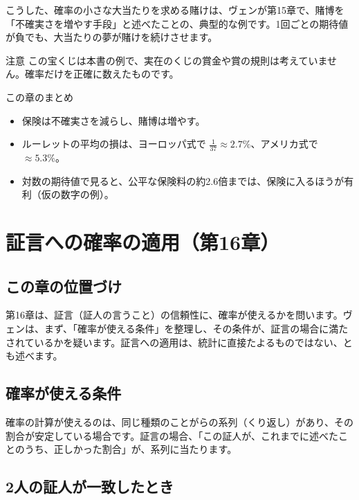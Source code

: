 \documentclass[a4paper,11pt,openany]{ltjsbook}
\begin{document}
こうした、確率の小さな大当たりを求める賭けは、ヴェンが第15章で、賭博を「不確実さを増やす手段」と述べたことの、典型的な例です。1回ごとの期待値が負でも、大当たりの夢が賭けを続けさせます。

\begin{notebox}{注意}
この宝くじは本書の例で、実在のくじの賞金や賞の規則は考えていません。確率だけを正確に数えたものです。
\end{notebox}

\begin{pointbox}{この章のまとめ}
\begin{itemize}[leftmargin=*]
\item 保険は不確実さを減らし、賭博は増やす。
\item ルーレットの平均の損は、ヨーロッパ式で $\tfrac1{37}\approx2.7\%$、アメリカ式で $\approx5.3\%$。
\item 対数の期待値で見ると、公平な保険料の約2.6倍までは、保険に入るほうが有利（仮の数字の例）。
\end{itemize}
\end{pointbox}

\chapter{証言への確率の適用（第16章）}

\section{この章の位置づけ}

第16章は、証言（証人の言うこと）の信頼性に、確率が使えるかを問います。ヴェンは、まず、「確率が使える条件」を整理し、その条件が、証言の場合に満たされているかを疑います。証言への適用は、統計に直接たよるものではない、とも述べます。

\section{確率が使える条件}

確率の計算が使えるのは、同じ種類のことがらの系列（くり返し）があり、その割合が安定している場合です。証言の場合、「この証人が、これまでに述べたことのうち、正しかった割合」が、系列に当たります。

\section{2人の証人が一致したとき}
\end{document}
